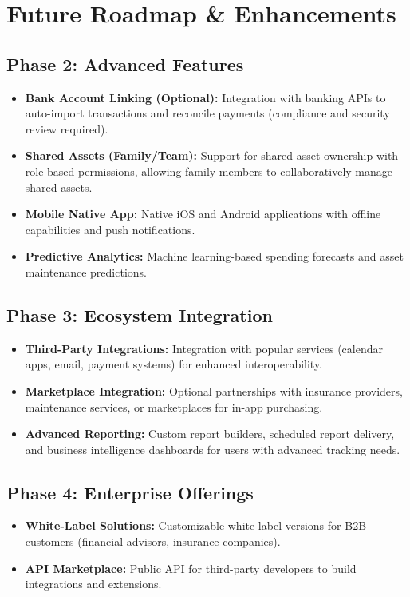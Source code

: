 \documentclass[11pt, a4paper]{article}
\begin{document}
\section{Future Roadmap \& Enhancements}

\subsection{Phase 2: Advanced Features}
\begin{itemize}
	\item \textbf{Bank Account Linking (Optional):} Integration with banking APIs to auto-import transactions and reconcile payments (compliance and security review required).
	\item \textbf{Shared Assets (Family/Team):} Support for shared asset ownership with role-based permissions, allowing family members to collaboratively manage shared assets.
	\item \textbf{Mobile Native App:} Native iOS and Android applications with offline capabilities and push notifications.
	\item \textbf{Predictive Analytics:} Machine learning-based spending forecasts and asset maintenance predictions.
\end{itemize}

\subsection{Phase 3: Ecosystem Integration}
\begin{itemize}
	\item \textbf{Third-Party Integrations:} Integration with popular services (calendar apps, email, payment systems) for enhanced interoperability.
	\item \textbf{Marketplace Integration:} Optional partnerships with insurance providers, maintenance services, or marketplaces for in-app purchasing.
	\item \textbf{Advanced Reporting:} Custom report builders, scheduled report delivery, and business intelligence dashboards for users with advanced tracking needs.
\end{itemize}

\subsection{Phase 4: Enterprise Offerings}
\begin{itemize}
	\item \textbf{White-Label Solutions:} Customizable white-label versions for B2B customers (financial advisors, insurance companies).
	\item \textbf{API Marketplace:} Public API for third-party developers to build integrations and extensions.
\end{itemize}
\end{document}

